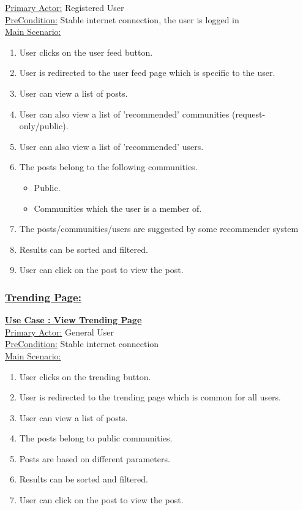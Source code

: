 \documentclass[conference,compsoc]{IEEEtran}
\newcounter{UC}
\newcommand{\nextU}{\stepcounter{UC}\theUC}
\begin{document}
\underline{Primary Actor:} Registered User\\

\underline{PreCondition:} Stable internet connection, the user is logged in\\

\underline{Main Scenario:}\\
\begin{enumerate}
    \item User clicks on the user feed button.
    \item User is redirected to the user feed page which is specific to the user.
    \item User can view a list of posts.
    \item User can also view a list of 'recommended' communities (request-only/public).
    \item User can also view a list of 'recommended' users.
    \item The posts belong to the following communities.
          \begin{itemize}
              \item Public.
              \item Communities which the user is a member of.
          \end{itemize}
    \item The posts/communities/users are suggested by some recommender system
    \item Results can be sorted and filtered.
    \item User can click on the post to view the post.
\end{enumerate}


\subsubsection{\underline{Trending Page:}}
\vspace{0.2cm}
\underline{\textbf{Use Case \nextU: View Trending Page}}\\

\underline{Primary Actor:} General User\\

\underline{PreCondition:} Stable internet connection\\

\underline{Main Scenario:}\\
\begin{enumerate}
    \item User clicks on the trending button.
    \item User is redirected to the trending page which is common for all users.
    \item User can view a list of posts.
    \item The posts belong to public communities.
    \item Posts are based on different parameters.
    \item Results can be sorted and filtered.
    \item User can click on the post to view the post.
\end{enumerate}
\end{document}
